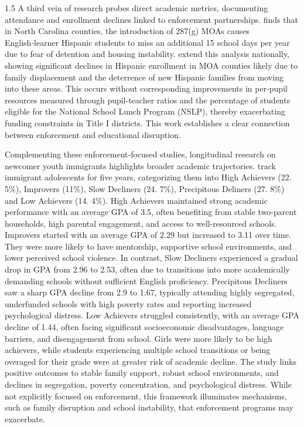 \documentclass[12pt]{article}
\begin{document}
\begin{spacing}{1.5}
A third vein of research probes direct academic metrics, documenting attendance and enrollment declines linked to enforcement partnerships. \citet{bellows2021} finds that in North Carolina counties, the introduction of 287(g) MOAs causes English‑learner Hispanic students to miss an additional 15 school days per year due to fear of detention and housing instability. \citet{dee2020} extend this analysis nationally, showing significant declines in Hispanic enrollment in MOA counties likely due to family displacement and the deterrence of new Hispanic families from moving into these areas. This occurs without corresponding improvements in per‑pupil resources measured through pupil-teacher ratios and the percentage of students eligible for the National School Lunch Program (NSLP), thereby exacerbating funding constraints in Title I districts. This work establishes a clear connection between enforcement and educational disruption.

Complementing these enforcement‑focused studies, longitudinal research on newcomer youth immigrants highlights broader academic trajectories. \citet{suarez2010} track immigrant adolescents for five years, categorizing them into High Achievers (22. 5\%), Improvers (11\%), Slow Decliners (24. 7\%), Precipitous Deliners (27. 8\%) and Low Achievers (14. 4\%). High Achievers maintained strong academic performance with an average GPA of 3.5, often benefiting from stable two-parent households, high parental engagement, and access to
well-resourced schools. Improvers started with an average GPA of 2.29 but increased to 3.11 over time. They were more likely to have mentorship, supportive school environments, and lower perceived school violence. In contrast, Slow Decliners experienced a gradual drop in GPA from 2.96 to 2.53, often due to transitions into more academically demanding schools without sufficient English proficiency. Precipitous Decliners saw a sharp GPA decline from 2.9 to 1.67, typically attending highly segregated, underfunded schools with high poverty rates and reporting increased psychological distress. Low Achievers struggled consistently, with an average GPA decline of 1.44, often facing significant socioeconomic disadvantages, language barriers, and disengagement from school. Girls were more likely to be high achievers, while students experiencing multiple school transitions or being overaged for their grade were at greater risk of academic decline. The study links positive outcomes to stable family support, robust school environments, and declines in segregation, poverty concentration, and psychological distress. While not explicitly focused on enforcement, this framework illuminates mechanisms, such as family disruption and school instability, that enforcement programs may exacerbate.
 

\end{spacing}
\end{document}
